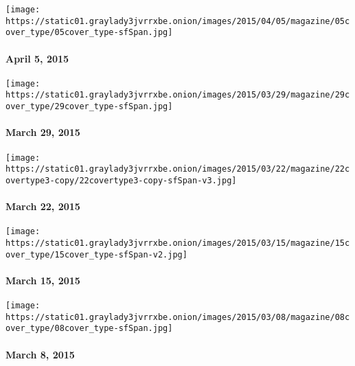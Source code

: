 \href{http://www.nytimes3xbfgragh.onion/indexes/2015/04/05/magazine/index.html}{}

\texttt{[image: https://static01.graylady3jvrrxbe.onion/images/2015/04/05/magazine/05cover\_type/05cover\_type-sfSpan.jpg]}

\hypertarget{april-5-2015}{%
\paragraph{April 5, 2015}\label{april-5-2015}}

\href{http://www.nytimes3xbfgragh.onion/indexes/2015/03/29/magazine/index.html}{}

\texttt{[image: https://static01.graylady3jvrrxbe.onion/images/2015/03/29/magazine/29cover\_type/29cover\_type-sfSpan.jpg]}

\hypertarget{march-29-2015}{%
\paragraph{March 29, 2015}\label{march-29-2015}}

\href{http://www.nytimes3xbfgragh.onion/indexes/2015/03/22/magazine/index.html}{}

\texttt{[image: https://static01.graylady3jvrrxbe.onion/images/2015/03/22/magazine/22covertype3-copy/22covertype3-copy-sfSpan-v3.jpg]}

\hypertarget{march-22-2015}{%
\paragraph{March 22, 2015}\label{march-22-2015}}

\href{http://www.nytimes3xbfgragh.onion/indexes/2015/03/15/magazine/index.html}{}

\texttt{[image: https://static01.graylady3jvrrxbe.onion/images/2015/03/15/magazine/15cover\_type/15cover\_type-sfSpan-v2.jpg]}

\hypertarget{march-15-2015}{%
\paragraph{March 15, 2015}\label{march-15-2015}}

\href{http://www.nytimes3xbfgragh.onion/indexes/2015/03/08/magazine/index.html}{}

\texttt{[image: https://static01.graylady3jvrrxbe.onion/images/2015/03/08/magazine/08cover\_type/08cover\_type-sfSpan.jpg]}

\hypertarget{march-8-2015}{%
\paragraph{March 8, 2015}\label{march-8-2015}}


